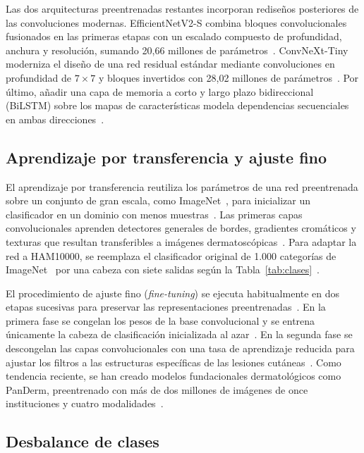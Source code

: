 Las dos arquitecturas preentrenadas restantes incorporan rediseños posteriores de las convoluciones modernas. EfficientNetV2-S combina bloques convolucionales fusionados en las primeras etapas con un escalado compuesto de profundidad, anchura y resolución, sumando 20,66 millones de parámetros~\cite{tan2021efficientnetv2}. ConvNeXt-Tiny moderniza el diseño de una red residual estándar mediante convoluciones en profundidad de $7 \times 7$ y bloques invertidos con 28,02 millones de parámetros~\cite{liu2022convnext}. Por último, añadir una capa de memoria a corto y largo plazo bidireccional (BiLSTM) sobre los mapas de características modela dependencias secuenciales en ambas direcciones~\cite{zhang2024dive}.

\subsection{Aprendizaje por transferencia y ajuste fino}

El aprendizaje por transferencia reutiliza los parámetros de una red preentrenada sobre un conjunto de gran escala, como ImageNet~\cite{deng2009imagenet}, para inicializar un clasificador en un dominio con menos muestras~\cite{zhang2024dive}. Las primeras capas convolucionales aprenden detectores generales de bordes, gradientes cromáticos y texturas que resultan transferibles a imágenes dermatoscópicas~\cite{zhang2024dive}. Para adaptar la red a HAM10000, se reemplaza el clasificador original de 1.000 categorías de ImageNet~\cite{deng2009imagenet} por una cabeza con siete salidas según la Tabla~\ref{tab:clases}~\cite{zhang2024dive}.

El procedimiento de ajuste fino (\textit{fine-tuning}) se ejecuta habitualmente en dos etapas sucesivas para preservar las representaciones preentrenadas~\cite{zhang2024dive}. En la primera fase se congelan los pesos de la base convolucional y se entrena únicamente la cabeza de clasificación inicializada al azar~\cite{zhang2024dive}. En la segunda fase se descongelan las capas convolucionales con una tasa de aprendizaje reducida para ajustar los filtros a las estructuras específicas de las lesiones cutáneas~\cite{zhang2024dive}. Como tendencia reciente, se han creado modelos fundacionales dermatológicos como PanDerm, preentrenado con más de dos millones de imágenes de once instituciones y cuatro modalidades~\cite{yan2025panderm}.

\subsection{Desbalance de clases}

